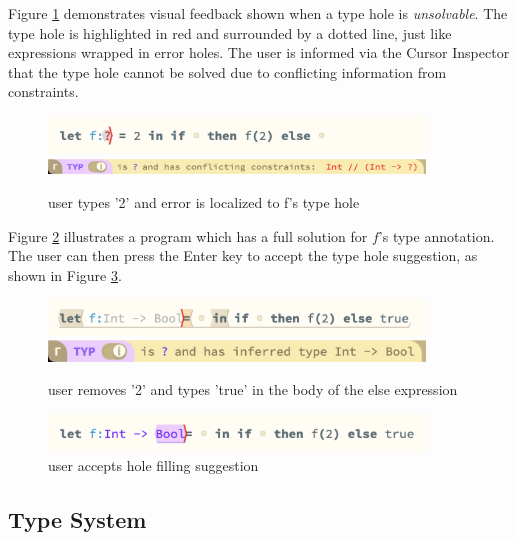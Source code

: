 Figure \ref{fig:editor_conflict} demonstrates visual feedback shown when a type hole is \textit{unsolvable}. The type hole is highlighted in red and surrounded by a dotted line, just like expressions wrapped in error holes. The user is informed via the Cursor Inspector that the type hole cannot be solved due to conflicting information from constraints.

\begin{figure}[H]
\includegraphics[width=10cm]{images/example_conflict.png}
\includegraphics[width=10cm]{images/example_conflict_CI.png}
\caption{user types '2' and error is localized to f's type hole}
\label{fig:editor_conflict}
\end{figure}

Figure \ref{fig:editor_ghost} illustrates a program which has a full solution for $f$'s type annotation. The user can then press the Enter key to accept the type hole suggestion, as shown in Figure \ref{fig:editor_complete}.

\begin{figure}[H]
\includegraphics[width=10cm]{images/example_ghost.png}
\includegraphics[width=10cm]{images/example_ghost_CI.png}
\caption{user removes '2' and types 'true' in the body of the else expression}
\label{fig:editor_ghost}
\end{figure}

\begin{figure}[H]
\includegraphics[width=10cm]{images/example_complete.png}
\caption{user accepts hole filling suggestion}
\label{fig:editor_complete}
\end{figure}


\subsection{Type System}

